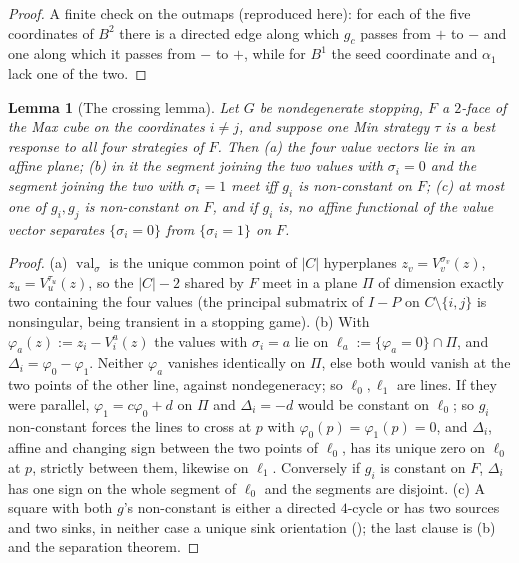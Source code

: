 \documentclass[11pt]{article}
\theoremstyle{plain}
\newtheorem{lemma}[theorem]{Lemma}
\theoremstyle{definition}
\DeclareMathOperator{\val}{val}
\begin{document}
\begin{proof}
A finite check on the outmaps (reproduced here): for each of the five
coordinates of $B^{2}$ there is a directed edge along which $g_c$ passes
from $+$ to $-$ and one along which it passes from $-$ to $+$, while for
$B^{1}$ the seed coordinate and $\alpha_1$ lack one of the two.
\end{proof}

\begin{lemma}[The crossing lemma]\label{lem:crossing}
Let $G$ be nondegenerate stopping, $F$ a $2$-face of the Max cube on the
coordinates $i\ne j$, and suppose one Min strategy $\tau$ is a best
response to all four strategies of $F$. Then (a) the four value vectors
lie in an affine plane; (b) in it the segment joining the two values
with $\sigma_i=0$ and the segment joining the two with $\sigma_i=1$ meet
iff $g_i$ is non-constant on $F$; (c) at most one of $g_i,g_j$ is
non-constant on $F$, and if $g_i$ is, no affine functional of the value
vector separates $\{\sigma_i=0\}$ from $\{\sigma_i=1\}$ on $F$.
\end{lemma}

\begin{proof}
(a) $\val_\sigma$ is the unique common point of $|C|$ hyperplanes
$z_v=V^{\sigma_v}_v(z)$, $z_u=V^{\tau_u}_u(z)$, so the $|C|-2$ shared by
$F$ meet in a plane $\Pi$ of dimension exactly two containing the four
values (the principal submatrix of $I-P$ on $C\setminus\{i,j\}$ is
nonsingular, being transient in a stopping game). (b) With
$\varphi_a(z):=z_i-V^{a}_i(z)$ the values with $\sigma_i=a$ lie on
$\ell_a:=\{\varphi_a=0\}\cap\Pi$, and $\Delta_i=\varphi_0-\varphi_1$.
Neither $\varphi_a$ vanishes identically on $\Pi$, else both would vanish
at the two points of the other line, against nondegeneracy; so
$\ell_0,\ell_1$ are lines. If they were parallel, $\varphi_1=c\varphi_0+d$
on $\Pi$ and $\Delta_i=-d$ would be constant on $\ell_0$; so $g_i$
non-constant forces the lines to cross at $p$ with
$\varphi_0(p)=\varphi_1(p)=0$, and $\Delta_i$, affine and changing sign
between the two points of $\ell_0$, has its unique zero on $\ell_0$ at
$p$, strictly between them, likewise on $\ell_1$. Conversely if $g_i$ is
constant on $F$, $\Delta_i$ has one sign on the whole segment of $\ell_0$
and the segments are disjoint. (c) A square with both $g$'s non-constant
is either a directed $4$-cycle or has two sources and two sinks, in
neither case a unique sink orientation
(); the last clause is (b) and the separation
theorem.
\end{proof}
\end{document}

